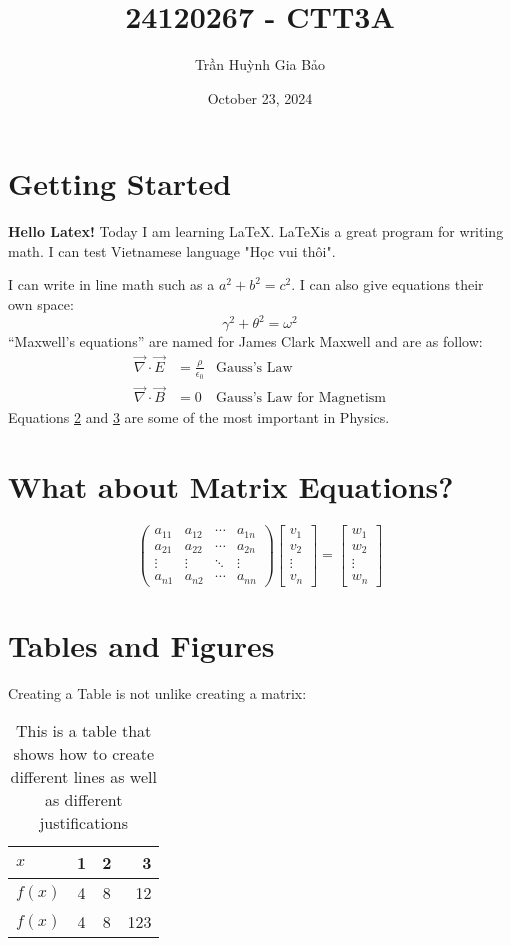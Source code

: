 \documentclass{article}
\title{24120267 - CTT3A}
\author{Trần Huỳnh Gia Bảo}
\date{October 23, 2024}
\begin{document}
\section{Getting Started}
\textbf{Hello Latex!} Today I am learning \LaTeX. \LaTeX is a great program for writing math. I can test Vietnamese language "Học vui thôi".

I can write in line math such as a $a^2 + b^2 = c^2$. I can also give equations their
own space:
\begin{equation}
    \gamma^2 + \theta^2 = \omega^2
\end{equation}
“Maxwell’s equations” are named for James Clark Maxwell and are as follow:
\begin{align}
    \vec{\nabla} \cdot \vec{E} &= \frac{\rho}{\epsilon_0} &\text{Gauss's Law} \\
    \vec{\nabla} \cdot \vec{B} &= 0 &\text{Gauss's Law for Magnetism}
\end{align}
Equations \ref{sec:matrix} and \ref{sec:table} are some of the most important in Physics.

\section{What about Matrix Equations?}
\label{sec:matrix}
\[
\begin{pmatrix}
    a_{11} & a_{12} & \cdots & a_{1n} \\
    a_{21} & a_{22} & \cdots & a_{2n} \\
    \vdots & \vdots & \ddots & \vdots \\
    a_{n1} & a_{n2} & \cdots & a_{nn}
\end{pmatrix}
\begin{bmatrix}
    v_1 \\
    v_2 \\
    \vdots \\
    v_n
\end{bmatrix}
=
\begin{bmatrix} 
    w_1 \\
    w_2 \\
    \vdots \\
    w_n
\end{bmatrix}
\]

\section{Tables and Figures}
\label{sec:table}
Creating a Table is not unlike creating a matrix:
\begin{table}[h]
    \centering
    \caption{This is a table that shows how to create different lines as well as different justifications}
    \begin{tabular}{|l||c|c|r|}
        \hline
        $x$ & 1 & 2 & 3 \\
        \hline
        $f(x)$ & 4 & 8 & 12 \\
        \hline
        $f(x)$ & 4 & 8 & 123 \\
        \hline
    \end{tabular}
\end{table}
\end{document}
